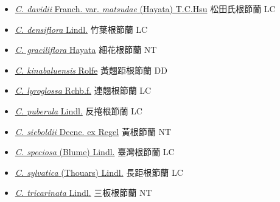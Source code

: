 \begin{itemize}
\begin{itemize}
        \item[] \href{http://www.theplantlist.org/tpl1.1/search?q=Calanthe+davidii+var.+matsudae}{\textit{C. davidii} Franch. var. \textit{matsudae} (Hayata) T.C.Hsu}   松田氏根節蘭   LC
        \item[] \href{http://www.theplantlist.org/tpl1.1/search?q=Calanthe+densiflora}{\textit{C. densiflora} Lindl.}   竹葉根節蘭   LC
        \item[] \href{http://www.theplantlist.org/tpl1.1/search?q=Calanthe+graciliflora}{\textit{C. graciliflora} Hayata}   細花根節蘭   NT
        \item[] \href{http://www.theplantlist.org/tpl1.1/search?q=Calanthe+kinabaluensis}{\textit{C. kinabaluensis} Rolfe}   黃翹距根節蘭   DD
        \item[] \href{http://www.theplantlist.org/tpl1.1/search?q=Calanthe+lyroglossa}{\textit{C. lyroglossa} Rchb.f.}   連翹根節蘭   LC
        \item[] \href{http://www.theplantlist.org/tpl1.1/search?q=Calanthe+puberula}{\textit{C. puberula} Lindl.}   反捲根節蘭   LC
        \item[] \href{http://www.theplantlist.org/tpl1.1/search?q=Calanthe+sieboldii}{\textit{C. sieboldii} Decne. ex Regel}   黃根節蘭   NT
        \item[] \href{http://www.theplantlist.org/tpl1.1/search?q=Calanthe+speciosa}{\textit{C. speciosa} (Blume) Lindl.}   臺灣根節蘭   LC
        \item[] \href{http://www.theplantlist.org/tpl1.1/search?q=Calanthe+sylvatica}{\textit{C. sylvatica} (Thouars) Lindl.}   長距根節蘭   LC
        \item[] \href{http://www.theplantlist.org/tpl1.1/search?q=Calanthe+tricarinata}{\textit{C. tricarinata} Lindl.}   三板根節蘭   NT

\end{itemize}
\end{itemize}
